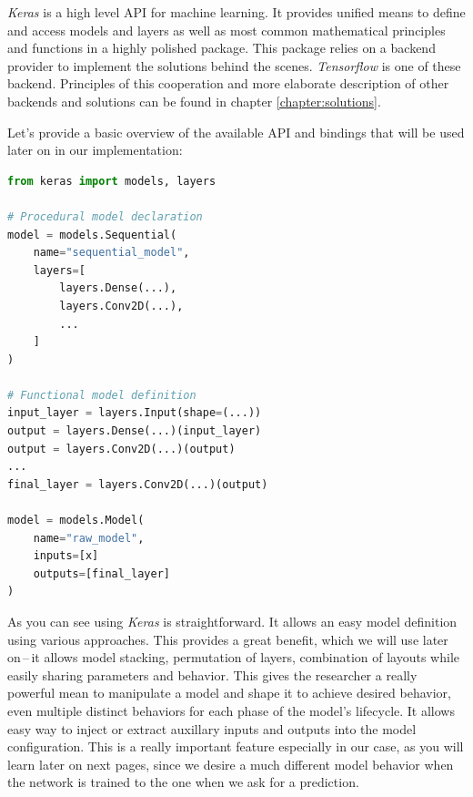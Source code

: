 \textit{Keras} is a high level API for machine learning. It provides unified means to define and access models and layers as well as most common mathematical principles and functions in a highly polished package. This package relies on a backend provider to implement the solutions behind the scenes. \textit{Tensorflow} is one of these backend. Principles of this cooperation and more elaborate description of other backends and solutions can be found in chapter \ref{chapter:solutions}.

Let's provide a basic overview of the available API and bindings that will be used later on in our implementation:

\begin{lstlisting}[language=Python, caption=Keras example]
from keras import models, layers

# Procedural model declaration
model = models.Sequential(
    name="sequential_model",
    layers=[
        layers.Dense(...),
        layers.Conv2D(...),
        ...
    ]
)

# Functional model definition
input_layer = layers.Input(shape=(...))
output = layers.Dense(...)(input_layer)
output = layers.Conv2D(...)(output)
...
final_layer = layers.Conv2D(...)(output)

model = models.Model(
    name="raw_model",
    inputs=[x]
    outputs=[final_layer]
)
\end{lstlisting}

As you can see using \textit{Keras} is straightforward. It allows an easy model definition using various approaches. This provides a great benefit, which we will use later on\,--\,it allows model stacking, permutation of layers, combination of layouts while easily sharing parameters and behavior. This gives the researcher a really powerful mean to manipulate a model and shape it to achieve desired behavior, even multiple distinct behaviors for each phase of the model's lifecycle. It allows easy way to inject or extract auxillary inputs and outputs into the model configuration. This is a really important feature especially in our case, as you will learn later on next pages, since we desire a much different model behavior when the network is trained to the one when we ask for a prediction.

